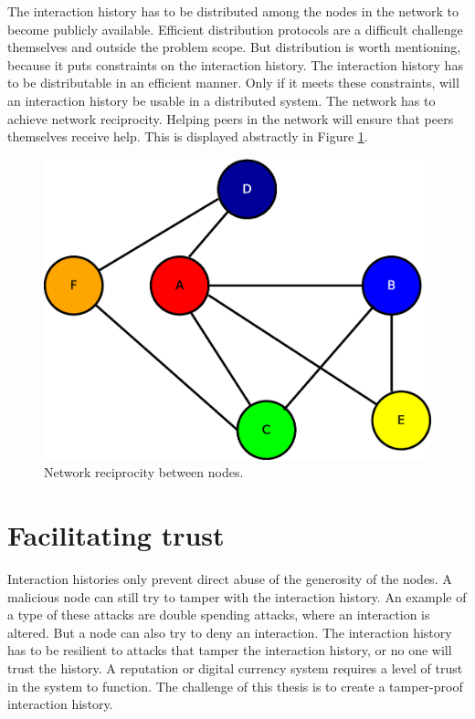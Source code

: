The interaction history has to be distributed among the nodes in the network
to become publicly available.
Efficient distribution protocols are a difficult challenge themselves and outside the problem scope.
But distribution is worth mentioning, because it puts constraints on the interaction history.
The interaction history has to be distributable in an efficient manner.
Only if it meets these constraints, will an interaction history be usable in a distributed system.
The network has to achieve network reciprocity\cite{Nowak-Cooperation}.
Helping peers in the network will ensure that peers themselves receive help.
This is displayed abstractly in Figure \ref{fig:network-reciprocity}.

\begin{figure}
	\centerline{\includegraphics[scale=0.3]{problemDescription/figs/network-reciprocity.eps}}
	\caption{Network reciprocity between nodes.}
	\label{fig:network-reciprocity}
\end{figure}

\section{Facilitating trust}
Interaction histories only prevent direct abuse of the generosity of the nodes.
A malicious node can still try to tamper with the interaction history.
An example of a type of these attacks are double spending attacks\cite{Nakamoto-bitcoin},
where an interaction is altered.
But a node can also try to deny an interaction.
The interaction history has to be resilient to attacks that tamper the interaction history, 
or no one will trust the history. 
A reputation or digital currency system requires a level of trust in the system to function.
The challenge of this thesis is to create a tamper-proof interaction history.

